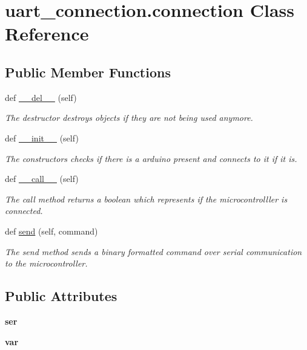 \hypertarget{classuart__connection_1_1connection}{}\section{uart\+\_\+connection.\+connection Class Reference}
\label{classuart__connection_1_1connection}
\subsection*{Public Member Functions}
\begin{DoxyCompactItemize}
\item 
def \hyperlink{classuart__connection_1_1connection_a024c5810ba0f705458acbcaa150cd357}{\+\_\+\+\_\+del\+\_\+\+\_\+} (self)
\begin{DoxyCompactList}\small\item\em The destructor destroys objects if they are not being used anymore. \end{DoxyCompactList}\item 
def \hyperlink{classuart__connection_1_1connection_aef00ac36fbfc67bfff3276c0cd2e6301}{\+\_\+\+\_\+init\+\_\+\+\_\+} (self)
\begin{DoxyCompactList}\small\item\em The constructors checks if there is a arduino present and connects to it if it is. \end{DoxyCompactList}\item 
def \hyperlink{classuart__connection_1_1connection_a9b7b9013cd1371f6d3e72f09b7073932}{\+\_\+\+\_\+call\+\_\+\+\_\+} (self)
\begin{DoxyCompactList}\small\item\em The call method returns a boolean which represents if the microcontrolller is connected. \end{DoxyCompactList}\item 
def \hyperlink{classuart__connection_1_1connection_adf7f182c05b3864beb0b72b987b2ada2}{send} (self, command)
\begin{DoxyCompactList}\small\item\em The send method sends a binary formatted command over serial communication to the microcontroller. \end{DoxyCompactList}\end{DoxyCompactItemize}
\subsection*{Public Attributes}
\begin{DoxyCompactItemize}
\item 
\mbox{\label{classuart__connection_1_1connection_a1b865aeee93b02308daa68c5df585e3f}} 
{\bfseries ser}
\item 
\mbox{\label{classuart__connection_1_1connection_afb1c9f9631efd2eee8287e93f50978bc}} 
{\bfseries var}
\end{DoxyCompactItemize}


